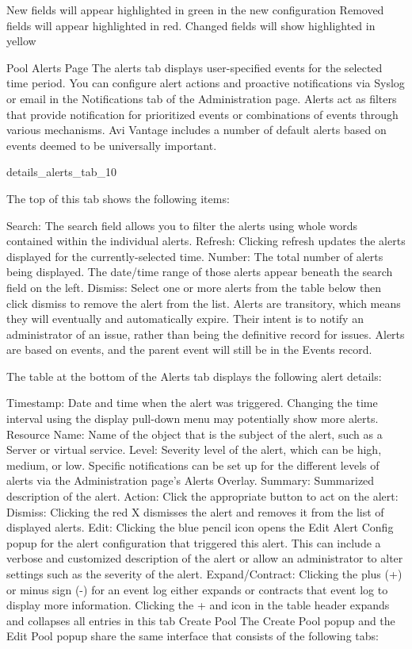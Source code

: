 \documentclass[letterpaper,10pt,english]{sphinxmanual}
\begin{document}
New fields will appear highlighted in green in the new configuration
Removed fields will appear highlighted in red.
Changed fields will show highlighted in yellow

Pool Alerts Page
The alerts tab displays user-specified events for the selected time period. You can configure alert actions and proactive notifications via Syslog or email in the Notifications tab of the Administration page. Alerts act as filters that provide notification for prioritized events or combinations of events through various mechanisms. Avi Vantage includes a number of default alerts based on events deemed to be universally important.

details\_alerts\_tab\_10

The top of this tab shows the following items:

Search: The search field allows you to filter the alerts using whole words contained within the individual alerts.
Refresh: Clicking refresh updates the alerts displayed for the currently-selected time.
Number: The total number of alerts being displayed. The date/time range of those alerts appear beneath the search field on the left.
Dismiss: Select one or more alerts from the table below then click dismiss to remove the alert from the list.
Alerts are transitory, which means they will eventually and automatically expire. Their intent is to notify an administrator of an issue, rather than being the definitive record for issues. Alerts are based on events, and the parent event will still be in the Events record.

The table at the bottom of the Alerts tab displays the following alert details:

Timestamp: Date and time when the alert was triggered. Changing the time interval using the display pull-down menu may potentially show more alerts.
Resource Name: Name of the object that is the subject of the alert, such as a Server or virtual service.
Level: Severity level of the alert, which can be high, medium, or low. Specific notifications can be set up for the different levels of alerts via the Administration page's Alerts Overlay.
Summary: Summarized description of the alert.
Action: Click the appropriate button to act on the alert:
Dismiss: Clicking the red X dismisses the alert and removes it from the list of displayed alerts.
Edit: Clicking the blue pencil icon opens the Edit Alert Config popup for the alert configuration that triggered this alert. This can include a verbose and customized description of the alert or allow an administrator to alter settings such as the severity of the alert.
Expand/Contract: Clicking the plus (+) or minus sign (-) for an event log either expands or contracts that event log to display more information. Clicking the + and \textendash{} icon in the table header expands and collapses all entries in this tab
Create Pool
The Create Pool popup and the Edit Pool popup share the same interface that consists of the following tabs:
\end{document}
